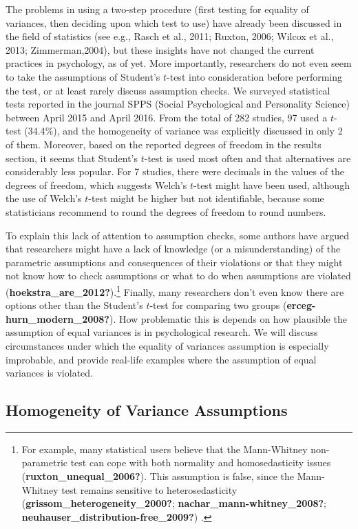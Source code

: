 \documentclass[
  english,
  man]{apa6}
\begin{document}
The problems in using a two-step procedure (first testing for equality of variances, then deciding upon which test to use) have already been discussed in the field of statistics (see e.g., Rasch et al., 2011; Ruxton, 2006; Wilcox et al., 2013; Zimmerman,2004), but these insights have not changed the current practices in psychology, as of yet. More importantly, researchers do not even seem to take the assumptions of Student's \(t\)-test into consideration before performing the test, or at least rarely discuss assumption checks. We surveyed statistical tests reported in the journal SPPS (Social Psychological and Personality Science) between April 2015 and April 2016. From the total of 282 studies, 97 used a \(t\)-test (34.4\(\%\)), and the homogeneity of variance was explicitly discussed in only 2 of them. Moreover, based on the reported degrees of freedom in the results section, it seems that Student's \(t\)-test is used most often and that alternatives are considerably less popular. For 7 studies, there were decimals in the values of the degrees of freedom, which suggests Welch's \(t\)-test might have been used, although the use of Welch's \(t\)-test might be higher but not identifiable, because some statisticians recommend to round the degrees of freedom to round numbers.

To explain this lack of attention to assumption checks, some authors have argued that researchers might have a lack of knowledge (or a misunderstanding) of the parametric assumptions and consequences of their violations or that they might not know how to check assumptions or what to do when assumptions are violated (\textbf{hoekstra\_are\_2012?}).\footnote{ For example, many statistical users believe that the Mann-Whitney non-parametric test can cope with both normality and homosedasticity issues (\textbf{ruxton\_unequal\_2006?}). This assumption is false, since the Mann-Whitney test remains sensitive to heterosedasticity (\textbf{grissom\_heterogeneity\_2000?}; \textbf{nachar\_mann-whitney\_2008?}; \textbf{neuhauser\_distribution-free\_2009?}) .} Finally, many researchers don't even know there are options other than the Student's \(t\)-test for comparing two groups (\textbf{erceg-hurn\_modern\_2008?}). How problematic this is depends on how plausible the assumption of equal variances is in psychological research. We will discuss circumstances under which the equality of variances assumption is especially improbable, and provide real-life examples where the assumption of equal variances is violated.

\hypertarget{homogeneity-of-variance-assumptions}{%
\subsection{Homogeneity of Variance Assumptions}\label{homogeneity-of-variance-assumptions}}
\end{document}
